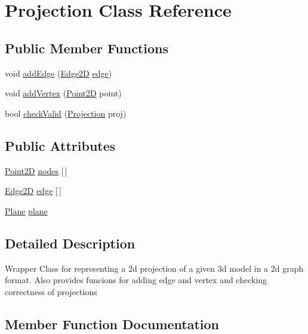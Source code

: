 \hypertarget{class_projection}{}\section{Projection Class Reference}
\label{class_projection}
\subsection*{Public Member Functions}
\begin{DoxyCompactItemize}
\item 
void \hyperlink{class_projection_addbe2dfdf6f53f9d1b7c0fb5a1d9f8e6}{add\+Edge} (\hyperlink{class_edge2_d}{Edge2D} \hyperlink{class_projection_aca9e310187f814f0afcacb1c97bfae45}{edge})
\item 
void \hyperlink{class_projection_afd8f16005bfb9bd16052f579e7c5c422}{add\+Vertex} (\hyperlink{class_point2_d}{Point2D} point)
\item 
bool \hyperlink{class_projection_a4936003f3ffbd4feeca8c5c08c018ffe}{check\+Valid} (\hyperlink{class_projection}{Projection} proj)
\end{DoxyCompactItemize}
\subsection*{Public Attributes}
\begin{DoxyCompactItemize}
\item 
\hyperlink{class_point2_d}{Point2D} \hyperlink{class_projection_aac3edf709f45c785e7f5ad7d7f5f42b9}{nodes} \mbox{[}$\,$\mbox{]}
\item 
\hyperlink{class_edge2_d}{Edge2D} \hyperlink{class_projection_aca9e310187f814f0afcacb1c97bfae45}{edge} \mbox{[}$\,$\mbox{]}
\item 
\hyperlink{class_plane}{Plane} \hyperlink{class_projection_a5c028a3e5b75d952d5c1a2283409a610}{plane}
\end{DoxyCompactItemize}


\subsection{Detailed Description}
Wrapper Class for representing a 2d projection of a given 3d model in a 2d graph format. Also provides funcions for adding edge and vertex and checking correctness of projections 

\subsection{Member Function Documentation}
\mbox{\label{class_projection_addbe2dfdf6f53f9d1b7c0fb5a1d9f8e6}} 
